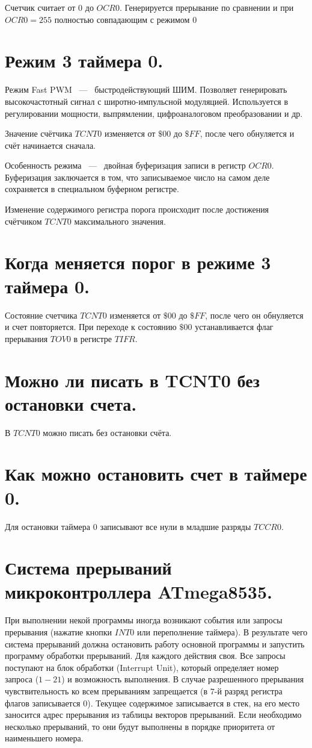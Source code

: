 Счетчик считает от $0$ до $OCR0$. Генерируется прерывание по сравнении и при $OCR0 = 255$ 
полностью совпадающим с режимом $0$

\section{Режим 3 таймера 0.}
Режим Fast PWM ~---~ быстродействующий ШИМ. Позволяет генерировать
высокочастотный сигнал с широтно-импульсной модуляцией. Используется 
в регулировании мощности, выпрямлении, цифроаналоговом преобразовании и др.

Значение счётчика $TCNT0$ изменяется от $\$00$ до $\$FF$, после чего 
обнуляется и счёт начинается сначала. 


Особенность режима ~---~ двойная буферизация записи в регистр $OCR0$.
Буферизация заключается в том, что записываемое число на самом деле сохраняется в
специальном буферном регистре.

Изменение содержимого регистра порога происходит после достижения 
счётчиком $TCNT0$ максимального значения. 

\section{Когда меняется порог в режиме 3 таймера 0.}
Состояние счетчика $TCNT0$ изменяется от $\$00$ до $\$FF$, после чего он обнуляется и счет 
повторяется. При переходе к состоянию $\$00$ устанавливается флаг прерывания $TOV0$ в 
регистре $TIFR$.

\section{Можно ли писать в TCNT0 без остановки счета.}
В $TCNT0$ можно писать без остановки счёта.

\section{Как можно остановить счет в таймере 0.}
Для остановки таймера $0$ записывают все нули в младшие разряды $TCCR0$.

\section{Система прерываний микроконтроллера ATmega8535.}
При выполнении некой программы иногда возникают события или запросы прерывания (нажатие кнопки
$INT0$ или переполнение таймера). В результате чего система прерываний должна остановить
работу основной программы и запустить программу обработки прерываний. Для каждого действия 
своя. Все запросы поступают на блок обработки (Interrupt Unit), который определяет номер 
запроса ($1-21$) и возможность выполнения. В случае разрешенного прерывания чувствительность
ко всем прерываниям запрещается (в $7$-й разряд регистра флагов записывается $0$). Текущее 
содержимое записывается в стек, на его место заносится адрес прерывания из таблицы векторов 
прерываний. Если необходимо несколько прерываний, то они будут выполнены в порядке приоритета 
от наименьшего номера.

